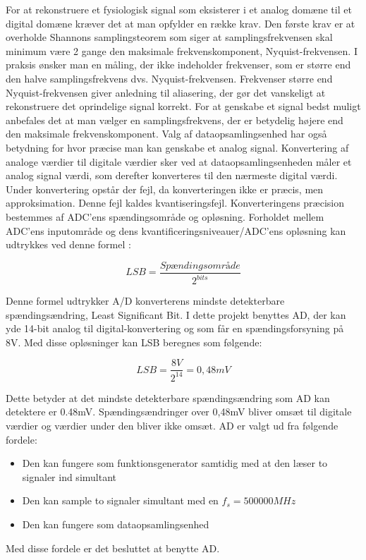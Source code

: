 For at rekonstruere et fysiologisk signal som eksisterer i et analog domæne til et digital domæne kræver det at man opfylder en række krav. Den første krav er at overholde Shannons samplingsteorem som siger at samplingsfrekvensen skal minimum være 2 gange den maksimale frekvenskomponent, Nyquist-frekvensen. I praksis ønsker man en måling, der ikke indeholder frekvenser, som er større end den halve samplingsfrekvens dvs. Nyquist-frekvensen. Frekvenser større end Nyquist-frekvensen giver anledning til aliasering, der gør det vanskeligt at rekonstruere det oprindelige signal korrekt. For at genskabe et signal bedst muligt anbefales det at man vælger en samplingsfrekvens, der er betydelig højere end den maksimale frekvenskomponent. Valg af dataopsamlingsenhed har også betydning for hvor præcise man kan genskabe et analog signal. Konvertering af analoge værdier til digitale værdier sker ved at dataopsamlingsenheden måler et analog signal værdi, som derefter konverteres til den nærmeste digital værdi. Under konvertering opstår der fejl, da konverteringen ikke er præcis, men approksimation. Denne fejl kaldes kvantiseringsfejl.  Konverteringens præcision bestemmes af ADC'ens spændingsområde og opløsning. Forholdet mellem ADC'ens inputområde og dens kvantificeringsniveauer/ADC’ens opløsning kan udtrykkes ved denne formel  \cite [s. 634-635]{Lyons}:

\begin{equation}
\label{eq2.1}
 LSB=  \dfrac{{Spændingsområde}}{2^{bits}} 
\end{equation}

Denne formel udtrykker A/D konverterens mindste detekterbare spændingsændring, Least Significant Bit. I dette projekt benyttes AD, der kan yde 14-bit analog til digital-konvertering og som får en spændingsforsyning på 8V. Med disse opløsninger kan LSB beregnes som følgende:

 \begin{equation}
\label{eq2.2}
 LSB=  \dfrac{{8V}}{2^{14}}=0,48mV 
\end{equation}
 
 Dette betyder at det mindste detekterbare spændingsændring som AD kan detektere er 0.48mV. Spændingsændringer over 0,48mV bliver omsæt til digitale værdier og værdier under den bliver ikke omsæt. AD er valgt ud fra følgende fordele:
 
 \begin{itemize}
\item 	Den kan fungere som funktionsgenerator samtidig med at den læser to signaler ind simultant
\item Den kan sample to signaler simultant med en $f_{s}=500000MHz $
\item Den kan fungere som dataopsamlingsenhed 
 
\end{itemize}
Med disse fordele er det besluttet at benytte AD. 
 
